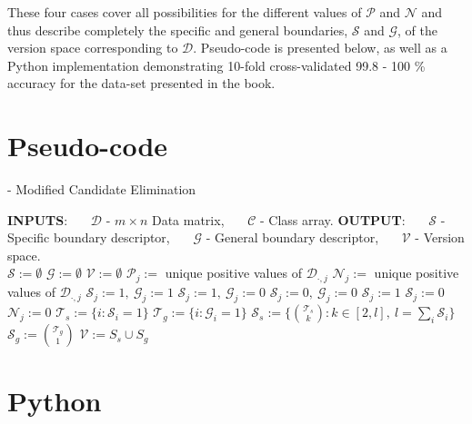 These four cases cover all possibilities for the different values of $\mathcal{P}$ and $\mathcal{N}$ and thus describe completely the specific and general boundaries, $\mathcal{S}$ and $\mathcal{G}$, of the version space corresponding to $\mathcal{D}$.  Pseudo-code is presented below, as well as a Python implementation demonstrating 10-fold cross-validated 99.8 - 100 \% accuracy for the data-set presented in the book.

\section*{Pseudo-code}

\begin{Algorithm}[H]{12cm}
  \caption{ - Modified Candidate Elimination}
  \begin{algorithmic} 
    \State \textbf{INPUTS}: 
    \State \ \ \ $\mathcal{D}$ - $m \times n$ Data matrix,
    \State \ \ \ $\mathcal{C}$ - Class array.
    \State \textbf{OUTPUT}: 
    \State \ \ \ $\mathcal{S}$ - Specific boundary descriptor,
    \State \ \ \ $\mathcal{G}$ - General boundary descriptor, 
    \State \ \ \ $\mathcal{V}$ - Version space.
    \\
    \hrulefill
      \State $\mathcal{S} := \emptyset$
      \State $\mathcal{G} := \emptyset$
      \State $\mathcal{V} := \emptyset$
        \State $\mathcal{P}_j :=$ unique positive values of $\mathcal{D}_{\cdot,j}$
        \State $\mathcal{N}_j :=$ unique positive values of $\mathcal{D}_{\cdot,j}$
          \State $\mathcal{S}_j := 1,\ \mathcal{G}_j := 1$
          \State $\mathcal{S}_j := 1,\ \mathcal{G}_j := 0$
          \State $\mathcal{S}_j := 0,\ \mathcal{G}_j := 0$
            \State $\mathcal{S}_j := 1$
          \Else
            \State $\mathcal{S}_j := 0$
          \EndIf
          \State $\mathcal{N}_j := 0$
        \EndIf
      \EndFor
      \State $\mathcal{T}_s := \{i : \mathcal{S}_i = 1\}$
      \State $\mathcal{T}_g := \{i : \mathcal{G}_i = 1\}$
      \State $\mathcal{S}_s := \{\binom{\mathcal{T}_s}{k} : k \in [2,l],\ l = \sum_i \mathcal{S}_i\}$
      \State $\mathcal{S}_g := \binom{\mathcal{T}_g}{1}$
      \State $\mathcal{V} := S_s \cup S_g$
    \EndFunction
  \end{algorithmic}
\end{Algorithm}


\section*{Python}








